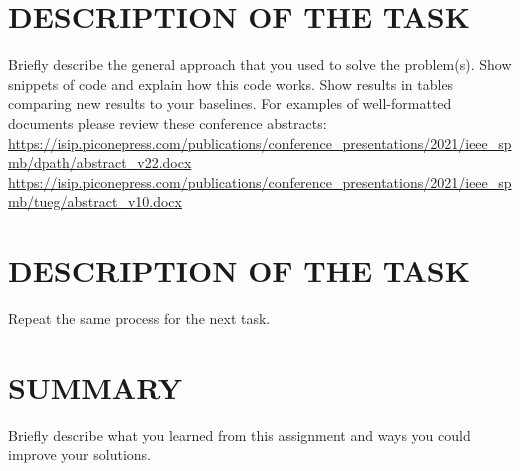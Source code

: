 \documentclass{article}
\begin{document}
        \section{DESCRIPTION OF THE TASK}
        \begin{flushleft}
        \large{Briefly describe the general approach that you used to solve the problem(s). Show snippets of code and explain how this code works. Show results in tables comparing new results to your baselines.}\break
        \break
        \large{For examples of well-formatted documents please review these conference abstracts:}\break
        \break
        \url{https://isip.piconepress.com/publications/conference_presentations/2021/ieee_spmb/dpath/abstract_v22.docx}\break
        \url{https://isip.piconepress.com/publications/conference_presentations/2021/ieee_spmb/tueg/abstract_v10.docx}
        \end{flushleft}
        \section{DESCRIPTION OF THE TASK}
        \large{Repeat the same process for the next task.}
        \section{SUMMARY}
        \large{Briefly describe what you learned from this assignment and ways you could improve your solutions.}
\end{document}
